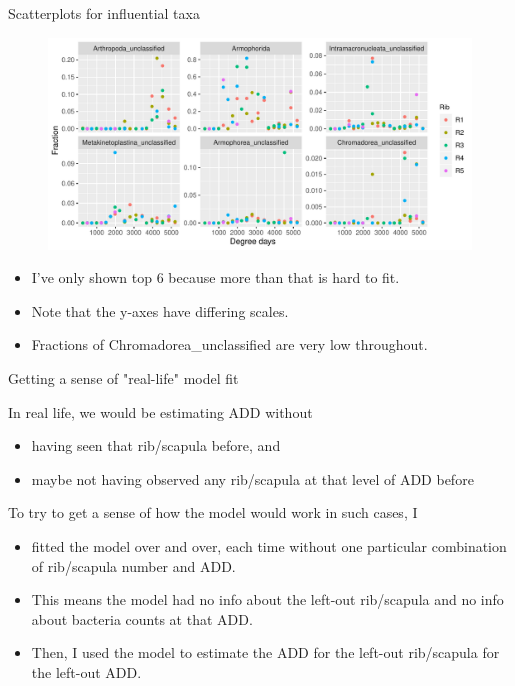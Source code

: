 \documentclass{beamer}
\begin{document}
\begin{frame}{Scatterplots for influential taxa}

  \begin{center}
    \begin{figure}
      \includegraphics[width=4.75in]{w_ribs/infl_rib_family_scatter}
    \end{figure}
  \end{center}
  \vspace{-0.25in}
  {\scriptsize
  \begin{itemize}
  \item I've only shown top 6 because more than that is hard to fit.
  \item Note that the y-axes have differing scales.
  \item Fractions of Chromadorea\_unclassified are very low throughout.
  \end{itemize}
  }

\end{frame}



\begin{frame}{Getting a sense of "real-life" model fit}

  \noindent In real life, we would be estimating ADD without
  \begin{itemize}
    \item having seen that rib/scapula before, and
    \item maybe not having observed any rib/scapula at that level of ADD before
  \end{itemize} 

  \vspace{0.1in}

  \noindent To try to get a sense of how the model would work in such cases, I
  \begin{itemize}
    \item fitted the model over and over, each time without one particular
    combination of rib/scapula number and ADD.
    \item This means the model had no info about the left-out rib/scapula and no
    info about bacteria counts at that ADD.
    \item Then, I used the model to estimate the ADD for the left-out
    rib/scapula for the left-out ADD.
  \end{itemize}
  
\end{frame}
\end{document}
